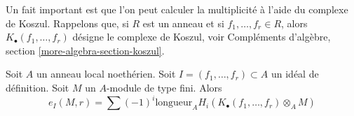 \noindent
Un fait important est que l'on peut calculer la multiplicité à l'aide
du complexe de Koszul. Rappelons que, si $R$ est un anneau et si
$f_1, \ldots, f_r \in R$, alors $K_\bullet(f_1, \ldots, f_r)$
désigne le complexe de Koszul, voir
Compléments d'algèbre, section \ref{more-algebra-section-koszul}.

\begin{theorem}
\label{theorem-multiplicity-with-koszul}
\begin{reference}
\cite[théorème 1, partie B du chapitre IV]{Serre_algebre_locale}
\end{reference}
Soit $A$ un anneau local noethérien. Soit $I = (f_1, \ldots, f_r) \subset A$
un idéal de définition. Soit $M$ un $A$-module de type fini. Alors
$$
e_I(M, r) = \sum
(-1)^i\text{longueur}_A H_i(K_\bullet(f_1, \ldots, f_r) \otimes_A M)
$$
\end{theorem}

